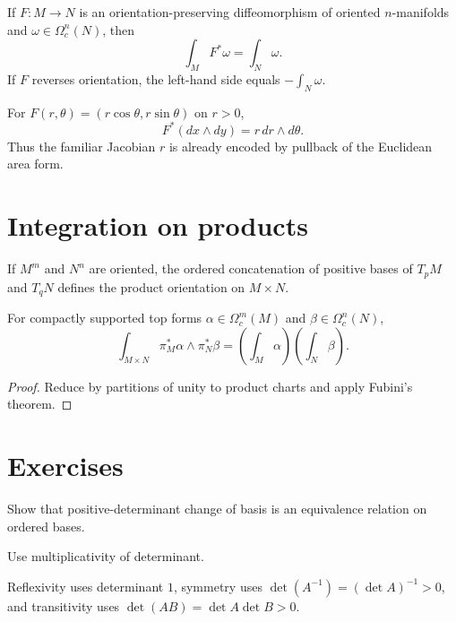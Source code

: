 \begin{theorem}\label{thm:vii10-change-variables}
If $F:M\to N$ is an orientation-preserving diffeomorphism of oriented $n$-manifolds and $\omega\in\Omega_c^n(N)$, then
\[
\int_M F^*\omega=\int_N\omega.
\]
If $F$ reverses orientation, the left-hand side equals $-\int_N\omega$.
\end{theorem}

\begin{example}\label{ex:vii10-polar}
For $F(r,\theta)=(r\cos\theta,r\sin\theta)$ on $r>0$,
\[
F^*(dx\wedge dy)=r\,dr\wedge d\theta.
\]
Thus the familiar Jacobian $r$ is already encoded by pullback of the Euclidean area form.
\end{example}

\section{Integration on products}
\begin{proposition}\label{prop:vii10-product-orientation}
If $M^m$ and $N^n$ are oriented, the ordered concatenation of positive bases of $T_pM$ and $T_qN$ defines the product orientation on $M\times N$.
\end{proposition}

\begin{proposition}\label{prop:vii10-product-integral}
For compactly supported top forms $\alpha\in\Omega_c^m(M)$ and $\beta\in\Omega_c^n(N)$,
\[
\int_{M\times N}\pi_M^*\alpha\wedge\pi_N^*\beta
=\left(\int_M\alpha\right)\left(\int_N\beta\right).
\]
\end{proposition}
\begin{proof}
Reduce by partitions of unity to product charts and apply Fubini's theorem.
\end{proof}


\section{Exercises}

\begin{exercise}\label{exr:vii10-01}
Show that positive-determinant change of basis is an equivalence relation on ordered bases.
\end{exercise}
\begin{hint}
Use multiplicativity of determinant.
\end{hint}
\begin{solution}
Reflexivity uses determinant $1$, symmetry uses $\det(A^{-1})=(\det A)^{-1}>0$, and transitivity uses $\det(AB)=\det A\det B>0$.
\end{solution}

